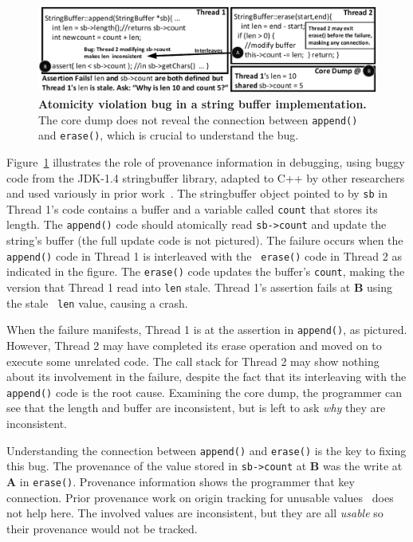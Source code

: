 \documentclass[preprint,10pt]{sigplanconf}
\begin{document}
\begin{figure}[h]
\centering
\includegraphics[width=\columnwidth]{figs/JDKStringBufferFail.pdf}
\caption{\label{fig:coreDumpFail}{\bf Atomicity violation bug in a string buffer implementation.} The core dump does not reveal the connection between {\tt append()} and {\tt erase()}, which is crucial to understand the bug.}
\end{figure}

Figure~\ref{fig:coreDumpFail} illustrates the role of provenance information in
debugging, using buggy code from the JDK-1.4 stringbuffer library, adapted to
C++ by other researchers and used variously in prior
work~\cite{concurrencybugs}.  The stringbuffer object pointed to by {\tt sb} in
Thread 1's code contains a buffer and a variable called {\tt count} that stores
its length.  The {\tt append()} code should atomically read {\tt sb->count} and
update the string's buffer (the full update code is not pictured).  The failure
occurs when the {\tt append()} code in Thread 1 is interleaved with the {\tt
erase()} code in Thread 2 as indicated in the figure.  The {\tt erase()} code
updates the buffer's {\tt count}, making the version that Thread 1 read into
{\tt len} stale.  Thread 1's assertion fails at {\bf B} using the stale {\tt
len} value, causing a crash.  

When the failure manifests, Thread 1 is at the assertion in {\tt append()}, as
pictured.  However, Thread 2 may have completed its erase operation and moved on
to execute some unrelated code.  The call stack for Thread 2 may show nothing
about its involvement in the failure, despite the fact that its interleaving
with the {\tt append()} code is the root cause.  Examining the core dump, the
programmer can see that the length and buffer are inconsistent, but is left to
ask {\em why} they are inconsistent.  

Understanding the connection between {\tt append()} and {\tt erase()} is the
key to fixing this bug.  The provenance of the value stored in {\tt sb->count}
at {\bf B} was the write at {\bf A} in {\tt erase()}.  Provenance information
shows the programmer that key connection.  Prior provenance work on origin
tracking for unusable values~\cite{badapples} does not help here.  The involved
values are inconsistent, but they are all {\em usable} so their provenance
would not be tracked.   
\end{document}
